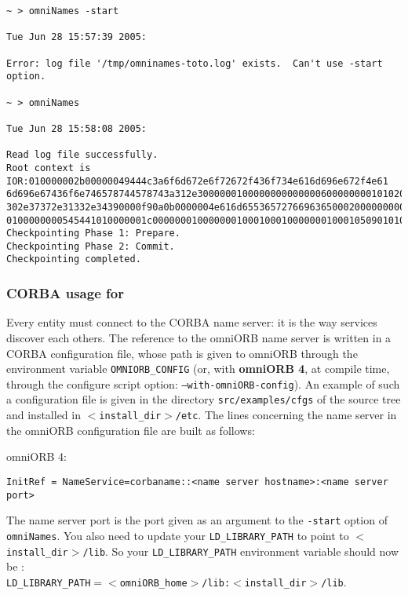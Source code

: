 {\footnotesize
\begin{verbatim}
~ > omniNames -start

Tue Jun 28 15:57:39 2005:

Error: log file '/tmp/omninames-toto.log' exists.  Can't use -start option.

~ > omniNames  

Tue Jun 28 15:58:08 2005:

Read log file successfully.
Root context is IOR:010000002b00000049444c3a6f6d672e6f72672f436f734e616d696e672f4e61
6d696e67436f6e746578744578743a312e300000010000000000000060000000010102000d0000003134
302e37372e31332e34390000f90a0b0000004e616d655365727669636500020000000000000008000000
0100000000545441010000001c0000000100000001000100010000000100010509010100010000000901
Checkpointing Phase 1: Prepare.
Checkpointing Phase 2: Commit.
Checkpointing completed.
\end{verbatim}
}

\subsubsection{CORBA usage for \diet}

Every \diet entity must connect to the CORBA name server: it is the way
services discover each others. The reference to the omniORB name server is
written in a CORBA configuration file, whose path is given to omniORB through
the environment variable \texttt{OMNIORB\_CONFIG} (or, with \textbf{omniORB 4},
at compile time, through the configure script option:
\texttt{--with-omniORB-config}). An example of such a configuration file is
given in the directory \texttt{src/examples/cfgs} of the \diet source tree and
installed in \texttt{$<$install\_dir$>$/etc}. The lines concerning the name
server in the omniORB configuration file are built as follows:
\begin{description}
 \item{omniORB 4:}
{\footnotesize
\begin{verbatim}
InitRef = NameService=corbaname::<name server hostname>:<name server port>
\end{verbatim}
} 
\end{description}
The name server port is the port given as an argument to the \texttt{-start}
option of \texttt{omniNames}. You also need to update your
\texttt{LD\_LIBRARY\_PATH} to point to \texttt{$<$install\_dir$>$/lib}.  So
your \texttt{LD\_LIBRARY\_PATH} environment variable should now be
:\\ \texttt{LD\_LIBRARY\_PATH$= <$omniORB\_home$>$/lib:$<$install\_dir$>$/lib}.

